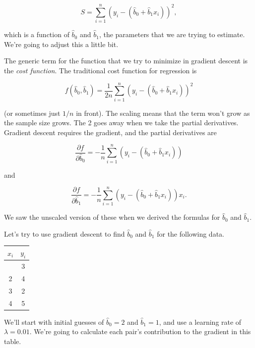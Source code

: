 \documentclass[
]{book}
\theoremstyle{definition}
\theoremstyle{definition}
\theoremstyle{definition}
\theoremstyle{definition}
\theoremstyle{remark}
\begin{document}
\[S=\sum_{i=1}^n(y_i-(\hat{b}_0+\hat{b}_1x_i))^2,\]

which is a function of \(\hat{b}_0\) and \(\hat{b}_1\), the parameters that we are trying to estimate. We're going to adjust this a little bit.

The generic term for the function that we try to minimize in gradient descent is the \emph{cost function}. The traditional cost function for regression is

\[f(\hat{b}_0,\hat{b}_1)=\frac{1}{2n}\sum_{i=1}^n(y_i-(\hat{b}_0+\hat{b}_1x_i))^2\]

(or sometimes just \(1/n\) in front). The scaling means that the term won't grow as the sample size grows. The 2 goes away when we take the partial derivatives. Gradient descent requires the gradient, and the partial derivatives are

\[\frac{\partial f}{\partial \hat{b}_0}=-\frac{1}{n}\sum_{i=1}^n(y_i-(\hat{b}_0+\hat{b}_1x_i))\]

and

\[\frac{\partial f}{\partial \hat{b}_1}=-\frac{1}{n}\sum_{i=1}^n(y_i-(\hat{b}_0+\hat{b}_1x_i))x_i.\]

We saw the unscaled version of these when we derived the formulas for \(\hat{b}_0\) and \(\hat{b}_1\).

Let's try to use gradient descent to find \(\hat{b}_0\) and \(\hat{b}_1\) for the following data.

\begin{longtable}[]{@{}cc@{}}
\toprule\noalign{}
\(x_i\) & \(y_i\) \\
\midrule\noalign{}
\endhead
\bottomrule\noalign{}
\endlastfoot
1 & 3 \\
2 & 4 \\
3 & 2 \\
4 & 5 \\
\end{longtable}

We'll start with initial guesses of \(\hat{b}_0=2\) and \(\hat{b}_1=1\), and use a learning rate of \(\lambda=0.01\). We're going to calculate each pair's contribution to the gradient in this table.
\end{document}
